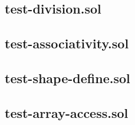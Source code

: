 \subsection{test-division.sol}


\subsection{test-associativity.sol}


\subsection{test-shape-define.sol}


\subsection{test-array-access.sol}


